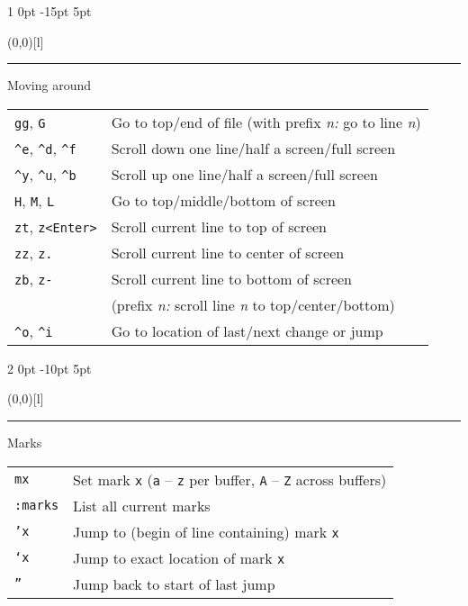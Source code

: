 \documentclass[a4paper, landscape, 10pt]{article}
\title{\GetDocumentProperties{hyperref/pdftitle}}
\author{\GetDocumentProperties{hyperref/pdfauthor}}
\date{\GetDocumentProperties{hyperref/pdfdate}}
\makeatletter
\renewcommand{\section}{%
    \@startsection{section}%
        {1}%
        {0pt}%
        {-15pt}%
        {5pt}%
        {\protect\makebox(0,0)[l]{\color{accentcolor!80}\rule[8pt]{\columnwidth}{19pt}}\hspace{.5em}\fontsize{14pt}{12pt}\selectfont\bfseries\color{white}}}
\renewcommand{\subsection}{%
    \@startsection{subsection}%
        {2}%
        {0pt}%
        {-10pt}%
        {5pt}%
        {\protect\makebox(0,0)[l]{\color{accentcolor!20}\rule[7pt]{\columnwidth}{19pt}}\hspace{.5em}\fontsize{12pt}{12pt}\selectfont\bfseries\itshape\color{accentcolor}}}
\newcommand{\V}[1]{\texttt{\textup{#1}}}
\makeatother
\begin{document}
\begin{multicols*}{3}
    {
        {
            \bfseries
            \hspace{.02\columnwidth}%
        }
%
        \color{solarizedbase00}\noindent
        \vspace*{-.2\baselineskip}
    }



    \section{Moving around}
    \begin{tabularx}{\columnwidth}{l>{\raggedright\arraybackslash}X}
\V{gg}, \V{G}
        &Go to top/end of file (with prefix \textit{n:} go to line \textit{n})\\
\verb|^e|, \verb|^d|, \verb|^f|
        &Scroll down one line/half a screen/full screen\\
\verb|^y|, \verb|^u|, \verb|^b|
        &Scroll up one line/half a screen/full screen\\
\V{H}, \V{M}, \V{L}
        &Go to top/middle/bottom of screen\\
\V{zt}, \V{z<Enter>}
        &Scroll current line to top of screen\\
\V{zz}, \V{z.}
        &Scroll current line to center of screen\\
\V{zb}, \V{z-}
        &Scroll current line to bottom of screen\\
        &(prefix \textit{n:} scroll line \textit{n} to top/center/bottom)\\
\verb|^o|, \verb|^i|
        &Go to location of last/next change or jump
    \end{tabularx}

\subsection{Marks}
    \begin{tabularx}{\columnwidth}{l>{\raggedright\arraybackslash}X}
\V{mx}
        &Set mark \V{x} (\V{a} – \V{z} per buffer, \V{A} – \V{Z} across buffers)\\
\V{:marks}
        &List all current marks\\
\V{'x}
        &Jump to (begin of line containing) mark \V{x}\\
\V{`x}
        &Jump to exact location of mark \V{x}\\
\V{''}
        &Jump back to start of last jump
    \end{tabularx}




\end{multicols*}
\end{document}
